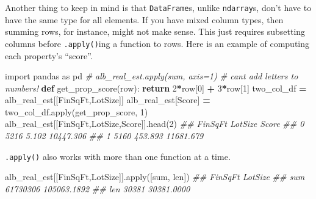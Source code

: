 \documentclass[
  12pt,
  krantz2]{krantz}
\makeatletter
\newenvironment{Shaded}{\begin{snugshade}}{\end{snugshade}}
\newcommand{\BuiltInTok}[1]{#1}
\newcommand{\CommentTok}[1]{\textcolor[rgb]{0.37,0.37,0.37}{\textit{#1}}}
\newcommand{\ControlFlowTok}[1]{\textcolor[rgb]{0.27,0.27,0.27}{\textbf{#1}}}
\newcommand{\DecValTok}[1]{\textcolor[rgb]{0.06,0.06,0.06}{#1}}
\newcommand{\ImportTok}[1]{#1}
\newcommand{\KeywordTok}[1]{\textcolor[rgb]{0.27,0.27,0.27}{\textbf{#1}}}
\newcommand{\NormalTok}[1]{#1}
\newcommand{\OperatorTok}[1]{\textcolor[rgb]{0.43,0.43,0.43}{\textbf{#1}}}
\newcommand{\StringTok}[1]{\textcolor[rgb]{0.5,0.5,0.5}{#1}}
\newenvironment{kframe}{%
\medskip{}
\setlength{\fboxsep}{.8em}
 \def\at@end@of@kframe{}%
 \ifinner\ifhmode%
  \def\at@end@of@kframe{\end{minipage}}%
  \begin{minipage}{\columnwidth}%
 \fi\fi%
 \def\FrameCommand##1{\hskip\@totalleftmargin \hskip-\fboxsep
 \colorbox{shadecolor}{##1}\hskip-\fboxsep
     \hskip-\linewidth \hskip-\@totalleftmargin \hskip\columnwidth}%
 \MakeFramed {\advance\hsize-\width
   \@totalleftmargin\z@ \linewidth\hsize
   \@setminipage}}%
 {\par\unskip\endMakeFramed%
 \at@end@of@kframe}
\renewenvironment{Shaded}{\begin{kframe}}{\end{kframe}}
\makeatother
\begin{document}
Another thing to keep in mind is that \texttt{DataFrame}s, unlike \texttt{ndarray}s, don't have to have the same type for all elements. If you have mixed column types, then summing rows, for instance, might not make sense. This just requires subsetting columns before \texttt{.apply()}ing a function to rows. Here is an example of computing each property's ``score''.

\begin{Shaded}
\begin{Highlighting}[]
\ImportTok{import}\NormalTok{ pandas }\ImportTok{as}\NormalTok{ pd}
\CommentTok{\# alb\_real\_est.apply(sum, axis=1) \# can\textquotesingle{}t add letters to numbers!}
\KeywordTok{def}\NormalTok{ get\_prop\_score(row):}
    \ControlFlowTok{return} \DecValTok{2}\OperatorTok{*}\NormalTok{row[}\DecValTok{0}\NormalTok{] }\OperatorTok{+} \DecValTok{3}\OperatorTok{*}\NormalTok{row[}\DecValTok{1}\NormalTok{]}
\NormalTok{two\_col\_df }\OperatorTok{=}\NormalTok{ alb\_real\_est[[}\StringTok{\textquotesingle{}FinSqFt\textquotesingle{}}\NormalTok{,}\StringTok{\textquotesingle{}LotSize\textquotesingle{}}\NormalTok{]]}
\NormalTok{alb\_real\_est[}\StringTok{\textquotesingle{}Score\textquotesingle{}}\NormalTok{] }\OperatorTok{=}\NormalTok{ two\_col\_df.}\BuiltInTok{apply}\NormalTok{(get\_prop\_score, }\DecValTok{1}\NormalTok{)}
\NormalTok{alb\_real\_est[[}\StringTok{\textquotesingle{}FinSqFt\textquotesingle{}}\NormalTok{,}\StringTok{\textquotesingle{}LotSize\textquotesingle{}}\NormalTok{,}\StringTok{\textquotesingle{}Score\textquotesingle{}}\NormalTok{]].head(}\DecValTok{2}\NormalTok{)}
\CommentTok{\#\#    FinSqFt  LotSize      Score}
\CommentTok{\#\# 0     5216    5.102  10447.306}
\CommentTok{\#\# 1     5160  453.893  11681.679}
\end{Highlighting}
\end{Shaded}

\texttt{.apply()} also works with more than one function at a time.

\begin{Shaded}
\begin{Highlighting}[]
\NormalTok{alb\_real\_est[[}\StringTok{\textquotesingle{}FinSqFt\textquotesingle{}}\NormalTok{,}\StringTok{\textquotesingle{}LotSize\textquotesingle{}}\NormalTok{]].}\BuiltInTok{apply}\NormalTok{([}\BuiltInTok{sum}\NormalTok{, }\BuiltInTok{len}\NormalTok{])}
\CommentTok{\#\#       FinSqFt      LotSize}
\CommentTok{\#\# sum  61730306  105063.1892}
\CommentTok{\#\# len     30381   30381.0000}
\end{Highlighting}
\end{Shaded}
\end{document}
